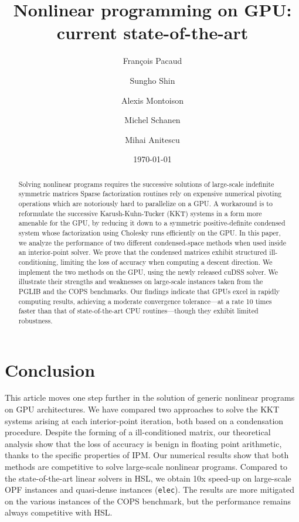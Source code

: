 \documentclass{article}
\title{Nonlinear programming on GPU: current state-of-the-art}
\author{François Pacaud \and
Sungho Shin \and
Alexis Montoison \and
Michel Schanen \and
Mihai Anitescu
}
\date{\today}
\theoremstyle{definition}
\theoremstyle{remark}
\begin{document}
\maketitle

\begin{abstract}
  Solving nonlinear programs requires the
  successive solutions of large-scale indefinite symmetric matrices
  Sparse factorization routines rely
  on expensive numerical pivoting operations
  which are notoriously hard to parallelize on a GPU.
  A workaround is to reformulate the successive Karush-Kuhn-Tucker (KKT) systems
  in a form more amenable for the GPU,
  by reducing it down to a symmetric positive-definite condensed
  system whose factorization using Cholesky runs efficiently on the GPU.
  In this paper, we analyze the performance of two different condensed-space methods
  when used inside an interior-point solver.
  We prove that the condensed matrices exhibit structured ill-conditioning,
  limiting the loss of accuracy when computing a descent direction.
  We implement the two methods on the GPU, using the newly
  released cuDSS solver. We illustrate their strengths and weaknesses
  on large-scale instances taken from the PGLIB and the COPS benchmarks.
  Our findings indicate that GPUs excel in rapidly computing results,
  achieving a moderate convergence tolerance---at a rate 10 times faster
  than that of state-of-the-art CPU routines---though they exhibit
  limited robustness.
\end{abstract}










\section{Conclusion}
This article moves one step further in the solution of generic nonlinear
programs on GPU architectures. We have compared two approaches
to solve the KKT systems arising at each interior-point iteration, both
based on a condensation procedure. Despite the forming of a ill-conditioned
matrix, our theoretical analysis show that the loss of accuracy is benign
in floating point arithmetic, thanks to the specific properties of IPM.
Our numerical results show that both methods are competitive to solve large-scale
nonlinear programs. Compared to the state-of-the-art linear solvers in HSL, we obtain 10x speed-up on large-scale OPF instances
and quasi-dense instances ({\tt elec}). The results are more mitigated
on the various instances of the COPS benchmark, but the performance remains
always competitive with HSL.
\end{document}
